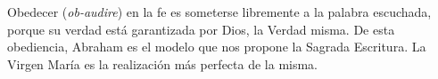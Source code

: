 	
	 Obedecer (\emph{ob-audire}) en la fe es someterse libremente a la palabra escuchada, porque su verdad está garantizada por Dios, la Verdad misma. De esta obediencia, Abraham es el modelo que nos propone la Sagrada Escritura. La Virgen María es la realización más perfecta de la misma.